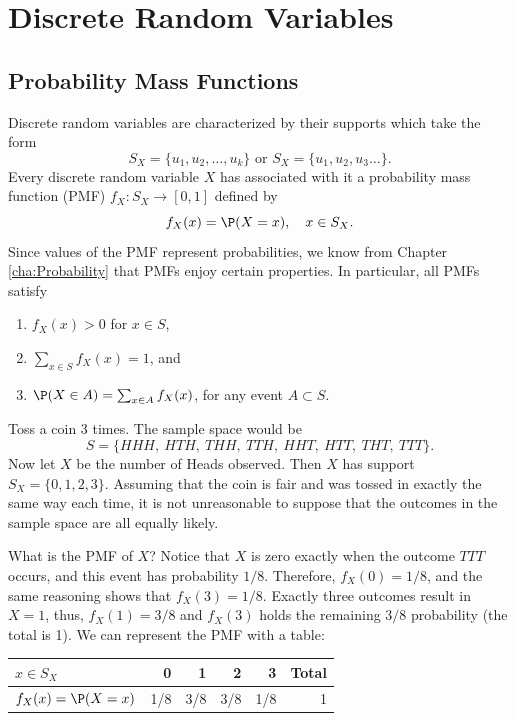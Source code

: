 \documentclass[captions=tableheading]{scrbook}
\begin{document}
\section{Discrete Random Variables}
\label{sec-5-1}

\label{sec:discrete-random-variables}
\subsection{Probability Mass Functions}
\label{sec-5-1-1}

\label{sub:probability-mass-functions}

Discrete random variables are characterized by their supports which take the form
\begin{equation}
S_{X}=\{u_{1},u_{2},\ldots,u_{k}\}\mbox{ or }S_{X}=\{u_{1},u_{2},u_{3}\ldots\}.
\end{equation}
Every discrete random variable \(X\) has associated with it a probability mass function (PMF) \(f_{X}:S_{X}\to[0,1]\) defined by
\begin{equation}
f_{X}(x)=\P(X=x),\quad x\in S_{X}.
\end{equation}
Since values of the PMF represent probabilities, we know from Chapter \ref{cha:Probability} that PMFs enjoy certain properties. In particular, all PMFs satisfy
\begin{enumerate}
\item \(f_{X}(x)>0\) for \(x\in S\),
\item \(\sum_{x\in S}f_{X}(x)=1\), and
\item \(\P(X\in A)=\sum_{x\in A}f_{X}(x)\), for any event \(A\subset S\).
\end{enumerate}

\begin{example}
\label{exa:Toss-a-coin}

Toss a coin 3 times. The sample space would be
\[
S=\{ HHH,\ HTH,\ THH,\ TTH,\ HHT,\ HTT,\ THT,\ TTT\}.
\]
Now let \(X\) be the number of Heads observed. Then \(X\) has support \(S_{X}=\{ 0,1,2,3\} \). Assuming that the coin is fair and was tossed in exactly the same way each time, it is not unreasonable to suppose that the outcomes in the sample space are all equally likely. 

What is the PMF of \(X\)? Notice that \(X\) is zero exactly when the outcome \(TTT\) occurs, and this event has probability \(1/8\). Therefore, \(f_{X}(0)=1/8\), and the same reasoning shows that \(f_{X}(3)=1/8\). Exactly three outcomes result in \(X=1\), thus, \(f_{X}(1)=3/8\) and \(f_{X}(3)\) holds the remaining \(3/8\) probability (the total is 1). We can represent the PMF with a table:

\begin{center}
\begin{tabular}{lrrrrr}
 \(x\in S_{X}\)        &    0  &    1  &    2  &    3  &  Total  \\
\hline
 \(f_{X}(x)=\P(X=x)\)  &  1/8  &  3/8  &  3/8  &  1/8  &      1  \\
\end{tabular}
\end{center}


\end{example}
\end{document}
